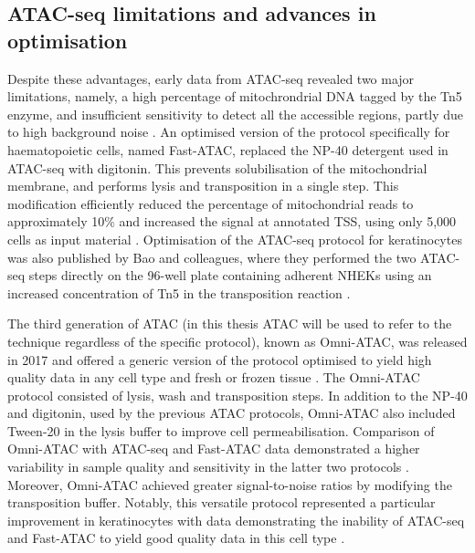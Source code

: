 \subsection{ATAC-seq limitations and advances in optimisation}  
Despite these advantages, early data from ATAC-seq revealed two major limitations, namely, a high percentage of mitochrondrial DNA tagged by the Tn5 enzyme, and insufficient sensitivity to detect all the accessible regions, partly due to high background noise \parencite{Corces2016, Sos2016}. An optimised version of the protocol specifically for haematopoietic cells, named Fast-ATAC, replaced the NP-40 detergent used in ATAC-seq with digitonin. This prevents solubilisation of the mitochondrial membrane, and performs lysis and transposition in a single step. This modification efficiently reduced the percentage of mitochondrial reads to approximately 10\% and increased the signal at annotated TSS, using only 5,000 cells as input material \parencite{Corces2016}. Optimisation of the ATAC-seq protocol for keratinocytes was also published by Bao and colleagues, where they performed the two ATAC-seq steps directly on the 96-well plate containing adherent NHEKs using an increased concentration of Tn5 in the transposition reaction \parencite{Bao2015}.


The third generation of ATAC (in this thesis  ATAC will be used to refer to the technique regardless of the specific protocol), known as Omni-ATAC, was released in 2017 and offered a generic version of the protocol optimised to yield high quality data in any cell type and fresh or frozen tissue \parencite{Corces2017}. The Omni-ATAC protocol consisted of lysis, wash and transposition steps. In addition to the NP-40 and digitonin, used by the previous ATAC protocols, Omni-ATAC also included Tween-20 in the lysis buffer to improve cell permeabilisation. Comparison of Omni-ATAC with ATAC-seq and Fast-ATAC data demonstrated a higher variability in sample quality and sensitivity in the latter two protocols \parencite{Corces2017}. Moreover, Omni-ATAC achieved greater signal-to-noise ratios by modifying the transposition buffer. Notably, this versatile protocol represented a particular improvement in keratinocytes with data demonstrating the inability of ATAC-seq and Fast-ATAC to yield good quality data in this cell type \parencite{Corces2017}.  



